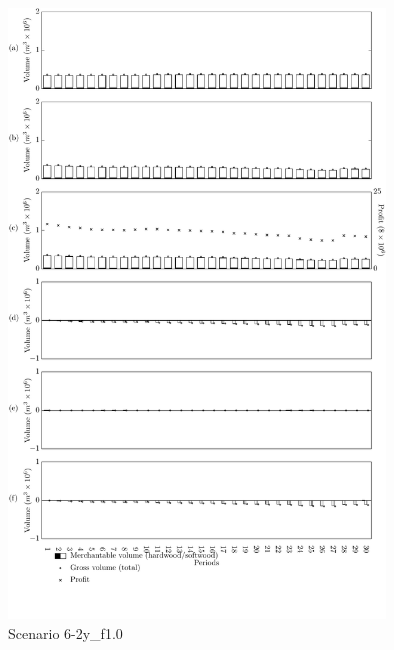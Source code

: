 \begin{figure}[h]
  \centering
  \includegraphics[width=10cm]{images/appendix/s6-1_p30a01}
  \caption{Scenario 6-2y\_f1.0}
  \label{fig:s6-2y_test100}
\end{figure}



